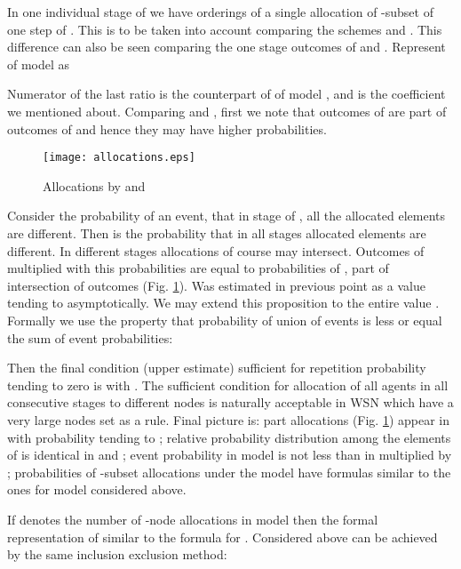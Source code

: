 \documentclass[conference]{IEEEtran}
\begin{document}
In one individual stage of  we have  orderings of a single allocation of -subset of one step of . This is to be taken into account comparing the schemes  and . This difference can also be seen comparing the one stage outcomes of  and . Represent  of model  as 

Numerator of the last ratio is the counterpart of  of model , and  is the coefficient we mentioned about. Comparing  and , first we note that outcomes of  are part of outcomes of  and hence they may have higher probabilities.
\begin{figure}[tb]
\begin{center}
\begin{minipage}[h]{\linewidth}  
\texttt{[image: allocations.eps]}
\end{minipage}
\end{center}
\caption{Allocations by  and }
\label{fig:allocations}
\end{figure}
Consider the probability  of an event, that in stage  of , all the allocated  elements are different. Then  is the probability that in all  stages allocated  elements are different. In different stages allocations of course may intersect. Outcomes of  multiplied with this probabilities are equal to probabilities of , part  of intersection of outcomes (Fig. \ref{fig:allocations}).  Was estimated in previous point as a value tending to  asymptotically. We may extend this proposition to the entire value .
Formally we use the property that probability of union of events is less or equal the sum of event probabilities:



Then the final condition (upper estimate) sufficient for repetition probability tending to zero is  with . The sufficient condition for allocation of all  agents in all  consecutive stages to different nodes  is naturally acceptable in WSN which have a very large nodes set as a rule.
Final picture is: part  allocations (Fig. \ref{fig:allocations}) appear in  with probability  tending to ; relative probability distribution among the elements of  is identical in  and ; event probability in model  is not less than in  multiplied by ; probabilities of  -subset allocations under the model  have formulas similar to the ones for model  considered above.


If  denotes the number of -node allocations in model  then the formal representation of  similar to the formula for . Considered above can be achieved by the same inclusion exclusion method:
\end{document}
